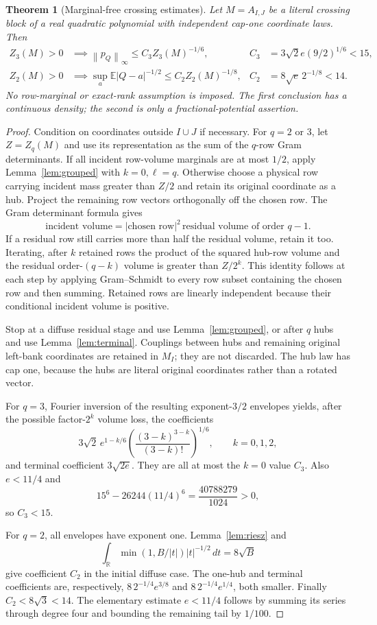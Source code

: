 \documentclass[11pt]{article}
\numberwithin{equation}{section}
\newtheorem{theorem}{Theorem}[section]
\theoremstyle{definition}\newtheorem{definition}[theorem]{Definition}
\theoremstyle{remark}\newtheorem{remark}[theorem]{Remark}
\newcommand{\R}{\mathbb R}\newcommand{\E}{\mathbb E}\newcommand{\PP}{\mathbb P}
\newcommand{\1}{\mathbf 1}\newcommand{\diag}{\operatorname{diag}}
\newcommand{\norm}[1]{\left\lVert#1\right\rVert}\newcommand{\abs}[1]{\left|#1\right|}
\begin{document}
\begin{theorem}[Marginal-free crossing estimates]\label{thm:free-volume}
Let $M=A_{I,J}$ be a literal crossing block of a real quadratic polynomial with independent cap-one coordinate laws. Then
\begin{align}
 Z_3(M)>0&\implies \norm{p_Q}_\infty\le C_3 Z_3(M)^{-1/6},
 &C_3&=3\sqrt2 e(9/2)^{1/6}<15,\label{eq:free-three}\\
 Z_2(M)>0&\implies \sup_a\E|Q-a|^{-1/2}\le C_2 Z_2(M)^{-1/8},
 &C_2&=8\sqrt e\,2^{-1/8}<14.\label{eq:free-two}
\end{align}
No row-marginal or exact-rank assumption is imposed. The first conclusion has a continuous density; the second is only a fractional-potential assertion.
\end{theorem}
\begin{proof}
Condition on coordinates outside $I\cup J$ if necessary. For $q=2$ or $3$, let $Z=Z_q(M)$ and use its representation as the sum of the $q$-row Gram determinants. If all incident row-volume marginals are at most $1/2$, apply Lemma~\ref{lem:grouped} with $k=0,\ell=q$. Otherwise choose a physical row carrying incident mass greater than $Z/2$ and retain its original coordinate as a hub. Project the remaining row vectors orthogonally off the chosen row. The Gram determinant formula gives
\[
 \text{incident volume}=|\text{chosen row}|^2\,
     \text{residual volume of order }q-1.
\]
If a residual row still carries more than half the residual volume, retain it too. Iterating, after $k$ retained rows the product of the squared hub-row volume and the residual order-$(q-k)$ volume is greater than $Z/2^k$. This identity follows at each step by applying Gram--Schmidt to every row subset containing the chosen row and then summing. Retained rows are linearly independent because their conditional incident volume is positive.

Stop at a diffuse residual stage and use Lemma~\ref{lem:grouped}, or after $q$ hubs and use Lemma~\ref{lem:terminal}. Couplings between hubs and remaining original left-bank coordinates are retained in $M_I$; they are not discarded. The hub law has cap one, because the hubs are literal original coordinates rather than a rotated vector.

For $q=3$, Fourier inversion of the resulting exponent-$3/2$ envelopes yields, after the possible factor-$2^k$ volume loss, the coefficients
\[
 3\sqrt2\,e^{1-k/6}
 \left(\frac{(3-k)^{3-k}}{(3-k)!}\right)^{1/6},
 \qquad k=0,1,2,
\]
and terminal coefficient $3\sqrt{2e}$. They are all at most the $k=0$ value $C_3$. Also $e<11/4$ and
\[
 15^6-26244(11/4)^6=\frac{40788279}{1024}>0,
\]
so $C_3<15$.

For $q=2$, all envelopes have exponent one. Lemma~\ref{lem:riesz} and
\[
 \int_\R\min(1,B/|t|)|t|^{-1/2}\,dt=8\sqrt B
\]
give coefficient $C_2$ in the initial diffuse case. The one-hub and terminal coefficients are, respectively, $8\,2^{-1/4}e^{3/8}$ and $8\,2^{-1/4}e^{1/4}$, both smaller. Finally $C_2<8\sqrt3<14$. The elementary estimate $e<11/4$ follows by summing its series through degree four and bounding the remaining tail by $1/100$.
\end{proof}
\end{document}
